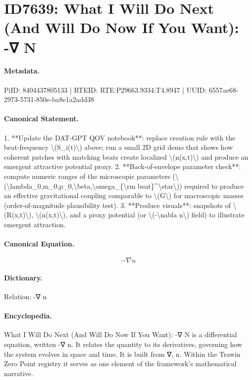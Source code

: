\section*{ID7639: What I Will Do Next (And Will Do Now If You Want): -∇ N}
\paragraph{Metadata.}
PiID: 8404437805133 | RTEID: RTE:P29663.9334:T4.8947 | UUID: 6557ae68-2973-5731-850e-ba8e1a2add38

\paragraph{Canonical Statement.}
1. **Update the DAT-GPT QOV notebook**: replace creation rule with the beat-frequency \textbackslash{}(S\_i(t)\textbackslash{}) above; run a small 2D grid demo that shows how coherent patches with matching beats create localized \textbackslash{}(n(x,t)\textbackslash{}) and produce an emergent attractive potential proxy. 2. **Back-of-envelope parameter check**: compute numeric ranges of the microscopic parameters (\textbackslash{}(\textbackslash{}lambda\_0,m\_0,p\_0,\textbackslash{}beta,\textbackslash{}omega\_\{\textbackslash{}rm beat\}\textasciicircum{}\textbackslash{}star\textbackslash{})) required to produce an effective gravitational coupling comparable to \textbackslash{}(G\textbackslash{}) for macroscopic masses (order-of-magnitude plausibility test). 3. **Produce visuals**: snapshots of \textbackslash{}(R(x,t)\textbackslash{}), \textbackslash{}(n(x,t)\textbackslash{}), and a proxy potential (or \textbackslash{}(-\textbackslash{}nabla n\textbackslash{}) field) to illustrate emergent attraction.

\paragraph{Canonical Equation.}
\[
-\nabla n
\]

\paragraph{Dictionary.}
Relation: -∇ n

\paragraph{Encyclopedia.}
What I Will Do Next (And Will Do Now If You Want): -∇ N is a differential equation, written -∇ n. It relates the quantity to its derivatives, governing how the system evolves in space and time. It is built from ∇, n. Within the Trawin Zero Point registry it serves as one element of the framework's mathematical narrative.
